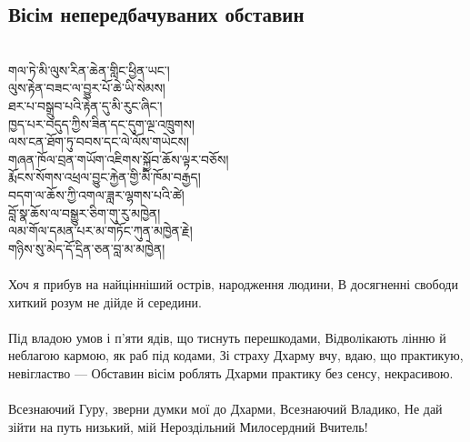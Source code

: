 \subsection*{Вісім непередбачуваних обставин}
\\
\ti
གལ་ཏེ་མི་ལུས་རིན་ཆེན་གླིང་ཕྱིན་ཡང༌།\\
ལུས་རྟེན་བཟང་ལ་བྱུར་པོ་ཆེ་ཡི་སེམས། \\
ཐར་པ་བསྒྲུབ་པའི་རྟེན་དུ་མི་རུང་ཞིང༌། \\
ཁྱད་པར་བདུད་ཀྱིས་ཟིན་དང་དུག་ལྔ་འཁྲུགས། \\
ལས་ངན་ཐོག་ཏུ་བབས་དང་ལེ་ལོས་གཡེངས། \\
གཞན་ཁོལ་བྲན་གཡོག་འཇིགས་སྐྱོབ་ཆོས་ལྟར་བཅོས། \\
རྨོངས་སོགས་འཕྲལ་བྱུང་རྐྱེན་གྱི་མི་ཁོམ་བརྒྱད། \\
བདག་ལ་ཆོས་ཀྱི་འགལ་ཟླར་ལྷགས་པའི་ཚེ། \\
བློ་སྣ་ཆོས་ལ་བསྒྱུར་ཅིག་གུ་རུ་མཁྱེན། \\
ལམ་གོལ་དམན་པར་མ་གཏོང་ཀུན་མཁྱེན་རྗེ། \\
གཉིས་སུ་མེད་དོ་དྲིན་ཅན་བླ་མ་མཁྱེན། \\
\\
\ru
\noindent
Хоч я прибув на найцінніший острів, народження людини,
В досягненні свободи хиткий розум не дійде й середини.\\
\\
Під владою умов і п'яти ядів, що тиснуть перешкодами,
Відволікають лінню й неблагою кармою, як раб під кодами,
Зі страху Дхарму вчу, вдаю, що практикую, невігластво ---
Обставин вісім роблять Дхарми практику без сенсу, некрасивою. \\
\\
Всезнаючий Гуру, зверни думки мої до Дхарми, Всезнаючий Владико,
Не дай зійти на путь низький, мій Нероздільний Милосердний Вчитель!\\

\newpage
